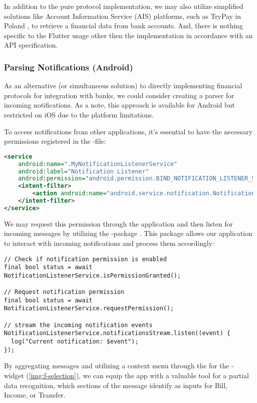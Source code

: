 In addition to the pure protocol implementation, we may also utilize simplified solutions like Account Information 
Service (AIS) platforms, such as TryPay in Poland , to retrieve a financial data from bank accounts. And, 
there is nothing specific to the Flutter usage other then the implementation in accordance with an API specification.


\subsubsection{Parsing Notifications (Android)}

As an alternative (or simultaneous solution) to directly implementing financial protocols for integration with banks, 
we could consider creating a parser for incoming notifications. As a note, this approach is available for Android but 
restricted on iOS due to the platform limitations. 

To access notifications from other applications, it's essential to have the necessary permissions registered in 
the -file:

\begin{lstlisting}[language=xml]
<service
    android:name=".MyNotificationListenerService"
    android:label="Notification Listener"
    android:permission="android.permission.BIND_NOTIFICATION_LISTENER_SERVICE">
    <intent-filter>
        <action android:name="android.service.notification.NotificationListenerService" />
    </intent-filter>
</service>
\end{lstlisting}

\noindent We may request this permission through the application and then listen for incoming messages by utilizing the 
-package . This package allows our application to interact with incoming 
notifications and process them accordingly:

\begin{lstlisting}
// Check if notification permission is enabled
final bool status = await NotificationListenerService.isPermissionGranted();

// Request notification permission
final bool status = await NotificationListenerService.requestPermission();

// stream the incoming notification events
NotificationListenerService.notificationsStream.listen((event) {
  log("Current notification: $event");
});
\end{lstlisting}

\noindent By aggregating messages and utilizing a context menu through the  for the 
-widget (\cref{img:f-selection}), we can equip the app with a valuable tool for a partial data 
recognition, which sections of the message identify as inputs for Bill, Income, or Transfer. 

